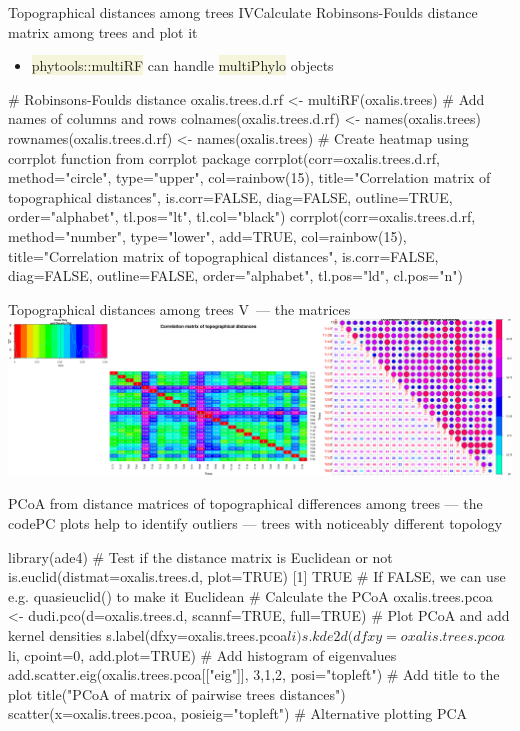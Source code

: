 \documentclass[compress, xelatex, 11pt, xcolor=svgnames, aspectratio=169,
	hyperref={
		bookmarks=true,
		unicode=true,
		colorlinks=true,
		pdftitle={Molecular data in R},
		plainpages=false,
		pdfauthor={Vojtech Zeisek},
		pdfsubject={Course about phylogeny and evolution in R},
		pdfcreator={XeLaTeX},
		pdfkeywords={R, evolution, phylogeny, molecular data},
		linkcolor=Crimson, %
		anchorcolor=Magenta, %
		citecolor=Magenta, %
		filecolor=Magenta, %
		menucolor=Magenta, %
		urlcolor=DodgerBlue, %
		},
	url={hyphens, lowtilde} %
	]{beamer}
\renewcommand{\texttt}[1]{\colorbox{Beige}{{\ttfamily #1}}}
\begin{document}
\begin{frame}[fragile]{Topographical distances among trees IV}{Calculate Robinsons-Foulds distance matrix among trees and plot it}
	\begin{itemize}
		\item \texttt{phytools::multiRF} can handle \texttt{multiPhylo} objects
	\end{itemize}
	\begin{spluscode}
    # Robinsons-Foulds distance
    oxalis.trees.d.rf <- multiRF(oxalis.trees)
    # Add names of columns and rows
    colnames(oxalis.trees.d.rf) <- names(oxalis.trees)
    rownames(oxalis.trees.d.rf) <- names(oxalis.trees)
    # Create heatmap using corrplot function from corrplot package
    corrplot(corr=oxalis.trees.d.rf, method="circle", type="upper",
      col=rainbow(15), title="Correlation matrix of topographical
      distances", is.corr=FALSE, diag=FALSE, outline=TRUE,
      order="alphabet", tl.pos="lt", tl.col="black")
    corrplot(corr=oxalis.trees.d.rf, method="number", type="lower",
      add=TRUE, col=rainbow(15), title="Correlation matrix of
      topographical distances", is.corr=FALSE, diag=FALSE,
      outline=FALSE, order="alphabet", tl.pos="ld", cl.pos="n")
	\end{spluscode}
\end{frame}

\begin{frame}{Topographical distances among trees V~--- the matrices}
	\includegraphics[width=\textwidth]{oxalis-dist.png}
\end{frame}

\begin{frame}[fragile]{PCoA from distance matrices of topographical differences among trees --- the code}{PC plots help to identify outliers --- trees with noticeably different topology}
	\begin{spluscode}
    library(ade4) # Test if the distance matrix is Euclidean or not
    is.euclid(distmat=oxalis.trees.d, plot=TRUE)
    [1] TRUE # If FALSE, we can use e.g. quasieuclid() to make it Euclidean
    # Calculate the PCoA
    oxalis.trees.pcoa <- dudi.pco(d=oxalis.trees.d, scannf=TRUE, full=TRUE)
    # Plot PCoA and add kernel densities
    s.label(dfxy=oxalis.trees.pcoa$li)
    s.kde2d(dfxy=oxalis.trees.pcoa$li, cpoint=0, add.plot=TRUE)
    # Add histogram of eigenvalues
    add.scatter.eig(oxalis.trees.pcoa[["eig"]], 3,1,2, posi="topleft")
    # Add title to the plot
    title("PCoA of matrix of pairwise trees distances")
    scatter(x=oxalis.trees.pcoa, posieig="topleft") # Alternative plotting PCA
	\end{spluscode}
\end{frame}
\end{document}
